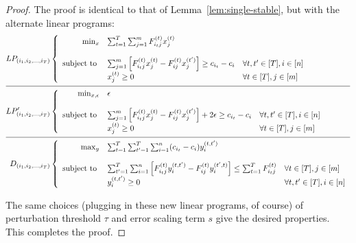 \documentclass{article}
\newcommand{\actionmapping}{(i_1, i_2, \ldots, i_T)}
\begin{document}
\begin{proof}
  The proof is identical to that of Lemma~\ref{lem:single-stable}, but with the alternate linear programs:
  \begin{align*}
  LP_{\actionmapping} &\left\{
    \begin{array}{rll}
                  \min_x & \sum_{t=1}^T \sum_{j=1}^m F^{(t)}_{i_t j} x^{(t)}_j \\
      \\
      \text{subject to } & \sum_{j=1}^m \left[ F^{(t)}_{i_tj} x^{(t)}_j - F^{(t)}_{ij} x^{(t')}_j \right] \ge c_{i_t} - c_i & \forall t,t' \in [T], i \in [n] \\
                         & x^{(t)}_j \ge 0                                                                                  & \forall t \in [T], j \in [m]
    \end{array}
  \right. \\ \cline{1-2}
  LP'_{\actionmapping} &\left\{
    \begin{array}{rll}
      \min_{x, \epsilon} & \epsilon \\
      \\
      \text{subject to } & \sum_{j=1}^m \left[ F^{(t)}_{i_tj} x^{(t)}_j - F^{(t)}_{ij} x^{(t')}_j \right] + 2 \epsilon \ge c_{i_t} - c_i & \forall t,t' \in [T], i \in [n] \\
                         & x^{(t)}_j \ge 0                                                                                               & \forall t \in [T], j \in [m]
    \end{array}
  \right. \\ \cline{1-2}
  D_{\actionmapping} &\left\{
    \begin{array}{rll}
                  \max_y & \sum_{t=1}^T \sum_{t'=1}^T \sum_{i=1}^n (c_{i_t} - c_i) y^{(t, t')}_i \\
      \\
      \text{subject to } & \sum_{t'=1}^T \sum_{i=1}^n \left[ F^{(t)}_{i_tj} y^{(t, t')}_i - F^{(t)}_{ij} y^{(t', t)}_i \right] \le \sum_{t=1}^T F^{(t)}_{i_tj} & \forall t \in [T], j \in [m] \\
                         & y^{(t, t')}_i \ge 0                                                                                                  & \forall t, t' \in [T], i \in [n]
    \end{array}
  \right.
  \end{align*}
  
  The same choices (plugging in these new linear programs, of course) of perturbation threshold $\tau$ and error scaling term $s$ give the desired properties. This completes the proof.
\end{proof}
\end{document}
